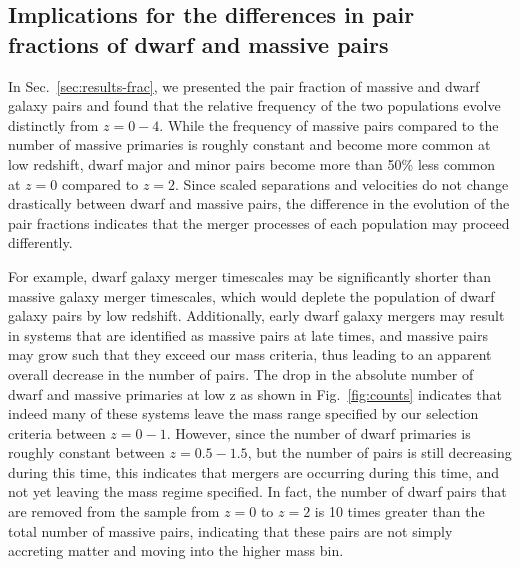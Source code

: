 \documentclass[twocolumn]{aastex631}
\newcommand{\kc}[1]{\textcolor{yellow}{\textbf{kc: #1}} }
\begin{document}
\subsection{Implications for the differences in pair fractions of dwarf and massive pairs}
In Sec.~\ref{sec:results-frac}, we presented the pair fraction of massive and dwarf galaxy pairs and found that the relative frequency of the two populations evolve distinctly from $z=0-4$. 
While the frequency of massive pairs compared to the number of massive primaries is roughly constant and become more common at low redshift, dwarf major and minor pairs become more than 50\% less common at $z=0$ compared to $z=2$. 
Since scaled separations and velocities do not change drastically between dwarf and massive pairs, the difference in the evolution of the pair fractions indicates that the merger processes of each population may proceed differently.



For example, dwarf galaxy merger timescales may be significantly shorter than massive galaxy merger timescales, which would deplete the population of dwarf galaxy pairs by low redshift. 
Additionally, early dwarf galaxy mergers may result in systems that are identified as massive pairs at late times, and massive pairs may grow such that they exceed our mass criteria, thus leading to an apparent overall decrease in the number of pairs. 
The drop in the absolute number of dwarf and massive primaries at low z as shown in Fig.~\ref{fig:counts} indicates that indeed many of these systems leave the mass range specified by our selection criteria between $z=0-1$. 
However, since the number of dwarf primaries is roughly constant between $z=0.5-1.5$, but the number of pairs is still decreasing during this time, this indicates that mergers are occurring during this time, and not yet leaving the mass regime specified. 
In fact, the number of dwarf pairs that are removed from the sample from $z=0$ to $z=2$ is 10 times greater than the total number of massive pairs, indicating that these pairs are not simply accreting matter and moving into the higher mass bin.
\end{document}
